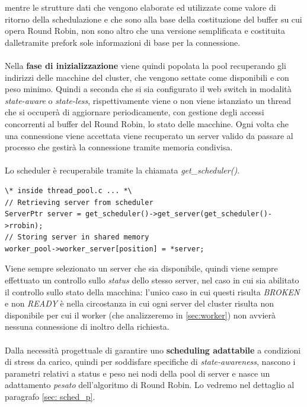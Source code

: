 \documentclass[italian]{tktltiki2}
\begin{document}
mentre le strutture dati che vengono elaborate ed utilizzate come valore di ritorno della schedulazione e che sono alla base della costituzione del buffer su cui opera Round Robin, non sono altro che una versione semplificata e costituita dalletramite prefork sole informazioni di base per la connessione. \\
\\
Nella \textbf{fase di inizializzazione} viene quindi popolata la pool recuperando gli indirizzi delle macchine del cluster, che vengono settate come disponibili e con peso minimo. Quindi a seconda che si sia configurato il web switch in modalità \emph{state-aware} o \emph{state-less}, rispettivamente viene o non viene istanziato un thread che si occuperà di aggiornare periodicamente, con gestione degli accessi concorrenti al buffer del Round Robin, lo stato delle macchine. Ogni volta che una connessione viene accettata viene recuperato un server valido da passare al processo che gestirà la connessione tramite memoria condivisa.
\\
\\ Lo scheduler è recuperabile tramite la chiamata \emph{get\_scheduler()}.
\begin{lstlisting}
\* inside thread_pool.c ... *\
// Retrieving server from scheduler
ServerPtr server = get_scheduler()->get_server(get_scheduler()->rrobin);
// Storing server in shared memory
worker_pool->worker_server[position] = *server;
\end{lstlisting}
Viene sempre selezionato un server che sia disponibile, quindi viene sempre effettuato un controllo sullo \emph{status} dello stesso server, nel caso in cui sia abilitato il controllo sullo stato della macchina: l'unico caso in cui questi risulta \emph{BROKEN} e non \emph{READY} è nella circostanza in cui ogni server del cluster risulta non disponibile per cui il worker (che analizzeremo in \ref{sec:worker}) non avvierà nessuna connessione di inoltro della richiesta. 
\\
\\
Dalla necessità progettuale di garantire uno \textbf{scheduling adattabile} a condizioni di stress da carico, quindi per soddisfare specifiche di \emph{state-awareness}, nascono i parametri relativi a status e peso nei nodi della pool di server e nasce un adattamento \emph{pesato} dell'algoritmo di Round Robin. Lo vedremo nel dettaglio al paragrafo \ref{sec: sched_p}.
\end{document}
